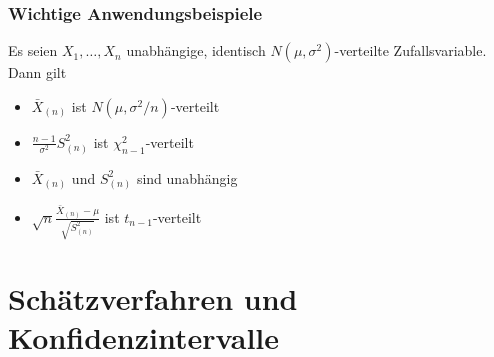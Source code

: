 \documentclass[
	ngerman,
	accentcolor=9c,%
	type=intern,
	marginpar=false
	]{tudapub}
\begin{document}
        \subsubsection{Wichtige Anwendungsbeispiele}
            \begin{satz}
                Es seien $X_1,\dots,X_n$ unabhängige, identisch $N(\mu,\sigma^2)$-verteilte Zufallsvariable. Dann gilt
                \begin{itemize}
                    \item $\bar{X}_{(n)} $ ist $ N(\mu, \sigma^2/n)$-verteilt
                    \item $\frac{n-1}{\sigma^2}S^2_{(n)} $ ist $ \chi_{n-1}^2$-verteilt
                    \item $\bar{X}_{(n)} $ und $S^2_{(n)}$ sind unabhängig
                    \item $\sqrt{n}\frac{\bar{X}_{(n)}- \mu}{\sqrt{S^2_{(n)}}}$ ist $t_{n-1}$-verteilt
                \end{itemize}
            \end{satz}
            \newpage
    \section{Schätzverfahren und Konfidenzintervalle}
\end{document}
